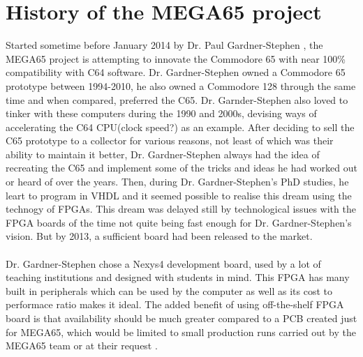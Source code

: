 \section{History of the MEGA65 project}
Started sometime before January 2014 by Dr. Paul Gardner-Stephen \cite{blogjan14}, the MEGA65 project is attempting to innovate the Commodore 65 with near 100\% compatibility with C64 software. Dr. Gardner-Stephen  owned a Commodore 65 prototype between 1994-2010, he also owned a Commodore 128 through the same time and when compared, preferred the C65. Dr. Garnder-Stephen also loved to tinker with these computers during the 1990 and 2000s, devising ways of accelerating the C64 CPU(clock speed?) as an example. After deciding to sell the C65 prototype to a collector for various reasons, not least of which was their ability to maintain it better, Dr. Gardner-Stephen always had the idea of recreating the C65 and implement some of the tricks and ideas he had worked out or heard of over the years. Then, during Dr. Gardner-Stephen's PhD studies, he leart to program in VHDL and it seemed possible to realise this dream using the technogy of FPGAs. This dream was delayed still by technological issues with the FPGA boards of the time not quite being fast enough for Dr. Gardner-Stephen's vision. But by 2013, a sufficient board had been released to the market. \\\\

Dr. Gardner-Stephen chose a Nexys4 development board, used by a lot of teaching institutions and designed with students in mind. This FPGA has many built in peripherals which can be used by the computer as well as its cost to performace ratio makes it ideal. The added benefit of using off-the-shelf FPGA board is that availability should be much greater compared to a PCB created just for MEGA65, which would be limited to small production runs carried out by the MEGA65 team or at their request \cite{blog30jan14}. \\\\

